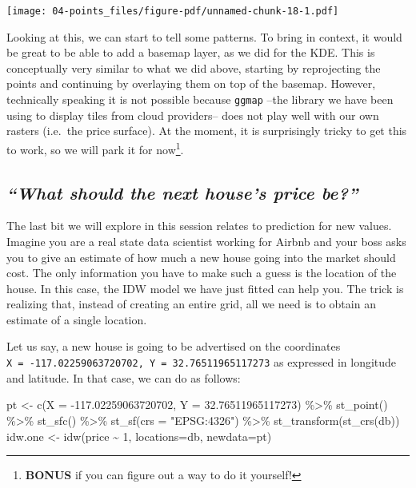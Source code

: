 \documentclass[
  letterpaper,
  DIV=11,
  numbers=noendperiod,
  oneside]{scrreprt}
\newenvironment{Shaded}{\begin{snugshade}}{\end{snugshade}}
\newcommand{\AttributeTok}[1]{\textcolor[rgb]{0.40,0.45,0.13}{#1}}
\newcommand{\DecValTok}[1]{\textcolor[rgb]{0.68,0.00,0.00}{#1}}
\newcommand{\FloatTok}[1]{\textcolor[rgb]{0.68,0.00,0.00}{#1}}
\newcommand{\FunctionTok}[1]{\textcolor[rgb]{0.28,0.35,0.67}{#1}}
\newcommand{\NormalTok}[1]{\textcolor[rgb]{0.00,0.23,0.31}{#1}}
\newcommand{\OtherTok}[1]{\textcolor[rgb]{0.00,0.23,0.31}{#1}}
\newcommand{\SpecialCharTok}[1]{\textcolor[rgb]{0.37,0.37,0.37}{#1}}
\newcommand{\StringTok}[1]{\textcolor[rgb]{0.13,0.47,0.30}{#1}}
\begin{document}
\texttt{[image: 04-points\_files/figure-pdf/unnamed-chunk-18-1.pdf]}

Looking at this, we can start to tell some patterns. To bring in
context, it would be great to be able to add a basemap layer, as we did
for the KDE. This is conceptually very similar to what we did above,
starting by reprojecting the points and continuing by overlaying them on
top of the basemap. However, technically speaking it is not possible
because \texttt{ggmap} --the library we have been using to display tiles
from cloud providers-- does not play well with our own rasters (i.e.~the
price surface). At the moment, it is surprisingly tricky to get this to
work, so we will park it for now\footnote{\textbf{BONUS} if you can
  figure out a way to do it yourself!}.

\subsection{\texorpdfstring{\emph{``What should the next house's price
be?''}}{``What should the next house's price be?''}}\label{what-should-the-next-houses-price-be}

The last bit we will explore in this session relates to prediction for
new values. Imagine you are a real state data scientist working for
Airbnb and your boss asks you to give an estimate of how much a new
house going into the market should cost. The only information you have
to make such a guess is the location of the house. In this case, the IDW
model we have just fitted can help you. The trick is realizing that,
instead of creating an entire grid, all we need is to obtain an estimate
of a single location.

Let us say, a new house is going to be advertised on the coordinates
\texttt{X\ =\ -117.02259063720702,\ Y\ =\ 32.76511965117273} as
expressed in longitude and latitude. In that case, we can do as follows:

\begin{Shaded}
\begin{Highlighting}[]
\NormalTok{pt }\OtherTok{\textless{}{-}} \FunctionTok{c}\NormalTok{(}\AttributeTok{X =} \SpecialCharTok{{-}}\FloatTok{117.02259063720702}\NormalTok{, }\AttributeTok{Y =} \FloatTok{32.76511965117273}\NormalTok{) }\SpecialCharTok{\%\textgreater{}\%}
  \FunctionTok{st\_point}\NormalTok{() }\SpecialCharTok{\%\textgreater{}\%}
  \FunctionTok{st\_sfc}\NormalTok{() }\SpecialCharTok{\%\textgreater{}\%}
  \FunctionTok{st\_sf}\NormalTok{(}\AttributeTok{crs =} \StringTok{"EPSG:4326"}\NormalTok{) }\SpecialCharTok{\%\textgreater{}\%}
  \FunctionTok{st\_transform}\NormalTok{(}\FunctionTok{st\_crs}\NormalTok{(db))}
\NormalTok{idw.one }\OtherTok{\textless{}{-}} \FunctionTok{idw}\NormalTok{(price }\SpecialCharTok{\textasciitilde{}} \DecValTok{1}\NormalTok{, }\AttributeTok{locations=}\NormalTok{db, }\AttributeTok{newdata=}\NormalTok{pt)}
\end{Highlighting}
\end{Shaded}
\end{document}
